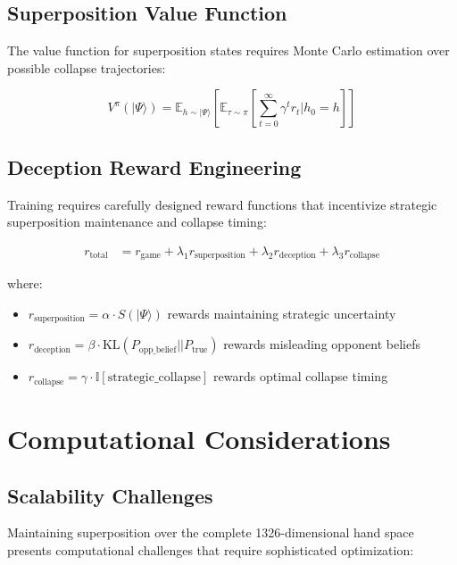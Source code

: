 \documentclass[11pt,a4paper]{article}
\begin{document}
\subsection{Superposition Value Function}

The value function for superposition states requires Monte Carlo estimation over possible collapse trajectories:

\begin{equation}
V^{\pi}(|\Psi\rangle) = \mathbb{E}_{h \sim |\Psi\rangle}\left[\mathbb{E}_{\tau \sim \pi}\left[\sum_{t=0}^{\infty} \gamma^t r_t \Big| h_0 = h\right]\right]
\end{equation}

\subsection{Deception Reward Engineering}

Training requires carefully designed reward functions that incentivize strategic superposition maintenance and collapse timing:

\begin{align}
r_{\text{total}} &= r_{\text{game}} + \lambda_1 r_{\text{superposition}} + \lambda_2 r_{\text{deception}} + \lambda_3 r_{\text{collapse}}
\end{align}

where:
\begin{itemize}
\item $r_{\text{superposition}} = \alpha \cdot S(|\Psi\rangle)$ rewards maintaining strategic uncertainty
\item $r_{\text{deception}} = \beta \cdot \text{KL}(P_{\text{opp\_belief}} || P_{\text{true}})$ rewards misleading opponent beliefs
\item $r_{\text{collapse}} = \gamma \cdot \mathbb{I}[\text{strategic\_collapse}]$ rewards optimal collapse timing
\end{itemize}

\section{Computational Considerations}

\subsection{Scalability Challenges}

Maintaining superposition over the complete 1326-dimensional hand space presents computational challenges that require sophisticated optimization:
\end{document}
